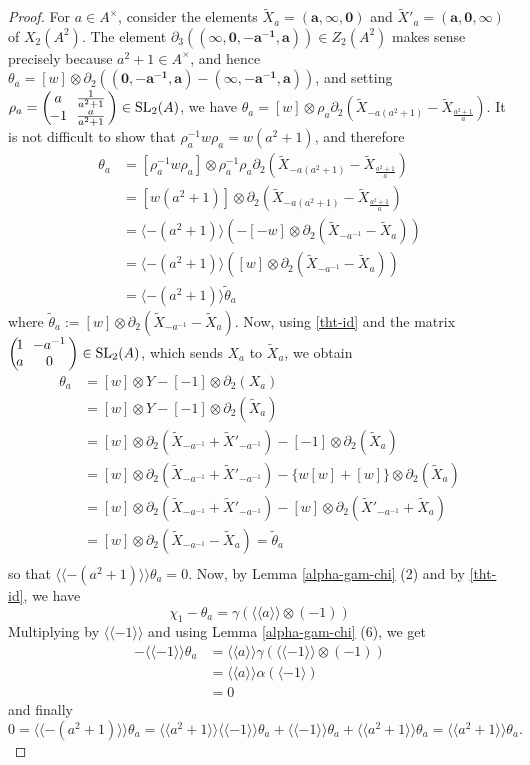 \documentclass[11pt]{amsart}
\theoremstyle{definition}
\theoremstyle{plain}
\numberwithin{equation}{section}
\renewcommand{\aa}{{A^\times}}
\newcommand{\lan}{\langle}
\newcommand{\ran}{\rangle}
\newcommand{\Lan}{\langle \! \langle}
\newcommand{\Ran}{\rangle \! \rangle}
\newcommand{\SL}{\mathit{{\rm SL}}}
\newcommand{\mtxx}[4]
{\left(\!\!
\begin{array}{cc}
\!\!#1 & \!\!#2\\
\!\!#3 & \!\!#4
\end{array}\!\!
\right)}
\begin{document}
\begin{proof}
    For $a\in\aa$, consider the elements $\tilde{X}_a=(\pmb{a},\pmb{\infty},\pmb{0})$ and $\tilde{X}'_a=(\pmb{a},\pmb{0},\pmb{\infty})$ of $X_2(A^2)$. The element $\partial_3((\pmb{\infty},\pmb{0},\pmb{-a^{-1}},\pmb{a}))\in Z_2(A^2)$ makes sense precisely because $a^2+1\in\aa$, and hence $\theta_a=[w]\otimes\partial_2((\pmb{0},\pmb{-a^{-1}},\pmb{a})-(\pmb{\infty},\pmb{-a^{-1}},\pmb{a}))$, and setting $\rho_a=\mtxx{a}{\frac{1}{a^2+1}}{-1}{\frac{a}{a^2+1}}\in\SL_2(A)$, we have $\theta_a=[w]\otimes\rho_a\partial_2(\tilde{X}_{-a(a^2+1)}-\tilde{X}_{\frac{a^2+1}{a}})$. It is not difficult to show that $\rho_a^{-1}w\rho_a=w(a^2+1)$, and therefore
    \begin{align*}
        \theta_a&=[\rho_a^{-1}w\rho_a]\otimes\rho_a^{-1}\rho_a\partial_2(\tilde{X}_{-a(a^2+1)}-\tilde{X}_{\frac{a^2+1}{a}})\\
        &=[w(a^2+1)]\otimes\partial_2(\tilde{X}_{-a(a^2+1)}-\tilde{X}_{\frac{a^2+1}{a}})\\
        &=\lan -(a^2+1)\ran(-[-w]\otimes\partial_2(\tilde{X}_{-a^{-1}}-\tilde{X}_{a}))\\
        &=\lan -(a^2+1)\ran ([w]\otimes\partial_2(\tilde{X}_{-a^{-1}}-\tilde{X}_a))\\
        &=\lan-(a^2+1)\ran\tilde{\theta}_a
    \end{align*}
    where $\tilde{\theta}_a:=[w]\otimes\partial_2(\tilde{X}_{-a^{-1}}-\tilde{X}_a)$. Now, using \eqref{tht-id} and the matrix $\mtxx{1}{-a^{-1}}{a}{0}\in\SL_2(A)$, which sends $X_a$ to $\tilde{X}_a$, we obtain
    \begin{align*}
        \theta_a&=[w]\otimes Y-[-1]\otimes\partial_2(X_a)\\
        &=[w]\otimes Y-[-1]\otimes\partial_2(\tilde{X}_a)\\
        &=[w]\otimes\partial_2(\tilde{X}_{-a^{-1}}+\tilde{X}'_{-a^{-1}})-[-1]\otimes\partial_2(\tilde{X}_a)\\
        &=[w]\otimes\partial_2(\tilde{X}_{-a^{-1}}+\tilde{X}'_{-a^{-1}})-\{w[w]+[w]\}\otimes\partial_2(\tilde{X}_a)\\
        &=[w]\otimes\partial_2(\tilde{X}_{-a^{-1}}+\tilde{X}'_{-a^{-1}})-[w]\otimes\partial_2(\tilde{X}'_{-a^{-1}}+\tilde{X}_a)\\
        &=[w]\otimes\partial_2(\tilde{X}_{-a^{-1}}-\tilde{X}_a)=\tilde{\theta}_a\\
    \end{align*}
    so that $\Lan-(a^2+1)\Ran\theta_a=0$.
    Now, by Lemma \ref{alpha-gam-chi} (2) and by \eqref{tht-id}, we have
    \[
    \chi_1-\theta_a=\gamma(\Lan a\Ran\otimes(-1))
    \]
    Multiplying by $\Lan -1\Ran$ and using Lemma \ref{alpha-gam-chi} (6), we get
    \begin{align*}
        -\Lan -1\Ran\theta_a&=\Lan a\Ran\gamma(\Lan -1\Ran\otimes(-1))\\
        &=\Lan a\Ran\alpha(\lan -1\ran)\\
        &=0
    \end{align*}
    and finally
    \[
        0=\Lan -(a^2+1)\Ran\theta_a=\Lan a^2+1\Ran\Lan -1\Ran\theta_a+\Lan -1\Ran\theta_a+\Lan a^2+1\Ran\theta_a=\Lan a^2+1\Ran\theta_a.
    \]
\end{proof}
\end{document}
